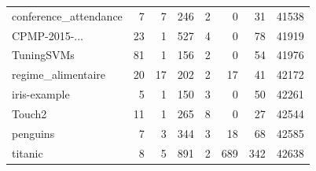 \begin{tabular}{@{\hskip 0mm}l@{\hskip 0mm}rrrrrrr}
 conference\_attendance & 7 & 7 & 246 & 2 & 0 & 31 & 41538 \\
 CPMP-2015-... & 23 & 1 & 527 & 4 & 0 & 78 & 41919 \\
 TuningSVMs & 81 & 1 & 156 & 2 & 0 & 54 & 41976 \\
 regime\_alimentaire & 20 & 17 & 202 & 2 & 17 & 41 & 42172 \\
 iris-example & 5 & 1 & 150 & 3 & 0 & 50 & 42261 \\
 Touch2 & 11 & 1 & 265 & 8 & 0 & 27 & 42544 \\
 penguins & 7 & 3 & 344 & 3 & 18 & 68 & 42585 \\
 titanic & 8 & 5 & 891 & 2 & 689 & 342 & 42638 \\
\bottomrule
\end{tabular}